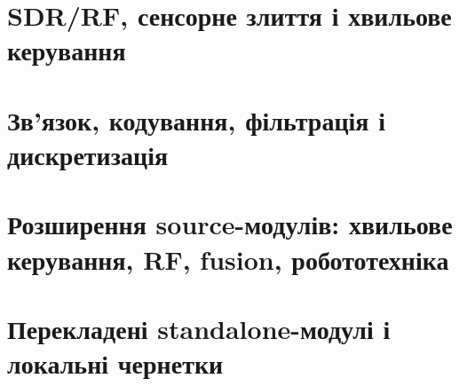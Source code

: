 \documentclass[11pt,a4paper,oneside]{book}
\begin{document}
\part{SDR/RF, сенсорне злиття і хвильове керування}








\part{Зв’язок, кодування, фільтрація і дискретизація}








\part{Розширення source-модулів: хвильове керування, RF, fusion, робототехніка}










\part{Перекладені standalone-модулі і локальні чернетки}








\end{document}
